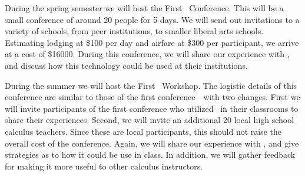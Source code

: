 \vspace{\topsep}

During the spring semester we will host the First
\mooculus\ Conference. This will be a small conference of around 20
people for 5 days. We will send out invitations to a variety of
schools, from peer institutions, to smaller liberal arts
schools. Estimating lodging at \$100 per day and airfare at \$300 per
participant, we arrive at a cost of \$16000. During this conference,
we will share our experience with \mooculus, and discuss how this
technology could be used at their institutions.

During the summer we will host the First \mooculus\ Workshop. The
logistic details of this conference are similar to those of the first
conference---with two changes. First we will invite participants of
the first conference who utilized \mooculus\ in their classrooms to
share their experiences. Second, we will invite an additional 20 local
high school calculus teachers. Since these are local participants,
this should not raise the overall cost of the conference. Again, we
will share our experience with \mooculus, and give strategies as to
how it could be use in class. In addition, we will gather feedback for
making it more useful to other calculus instructors.
